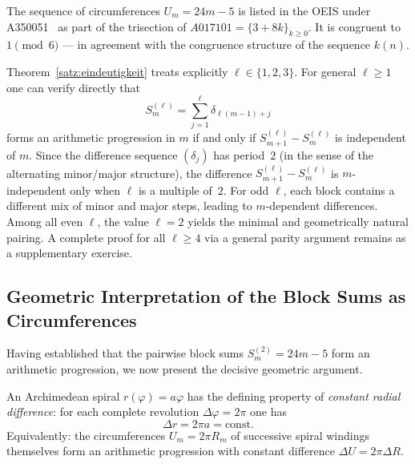 \begin{remark}
	The sequence of circumferences $U_m = 24m - 5$ is listed in the OEIS
	under A350051~\cite{OEIS} as part of the trisection of
	$A017101 = \{3 + 8k\}_{k \geq 0}$. It is congruent to
	$1 \pmod{6}$ --- in agreement with the congruence structure
	of the sequence $k(n)$.
\end{remark}

\begin{note}
Theorem~\ref{satz:eindeutigkeit} treats explicitly $\ell \in \{1,2,3\}$.
For general $\ell \geq 1$ one can verify directly that
\[
  S_m^{(\ell)} = \sum_{j=1}^{\ell} \delta_{\ell(m-1)+j}
\]
forms an arithmetic progression in $m$ if and only if
$S_{m+1}^{(\ell)} - S_m^{(\ell)}$ is independent of $m$.
Since the difference sequence $(\delta_j)$ has period~$2$
(in the sense of the alternating minor/major structure), the
difference $S_{m+1}^{(\ell)} - S_m^{(\ell)}$ is
$m$-independent only when $\ell$ is a multiple of~$2$.
For odd $\ell$, each block contains a different mix
of minor and major steps, leading to $m$-dependent differences.
Among all even $\ell$, the value $\ell = 2$ yields the minimal and
geometrically natural pairing. A complete proof for all
$\ell \geq 4$ via a general parity argument remains as
a supplementary exercise.
\end{note}

\subsection{Geometric Interpretation of the Block Sums as Circumferences}
\label{subsec:geometrische_interpretation}

Having established that the pairwise block sums $S_m^{(2)} = 24m - 5$ form
an arithmetic progression, we now present the decisive geometric argument.

An Archimedean spiral $r(\varphi) = a\varphi$ has the defining
property of \emph{constant radial difference}: for each complete
revolution $\Delta\varphi = 2\pi$ one has
\[
  \Delta r = 2\pi a = \text{const}.
\]
Equivalently: the circumferences $U_m = 2\pi R_m$ of successive
spiral windings themselves form an arithmetic progression with constant
difference $\Delta U = 2\pi \Delta R$.
\clearpage


